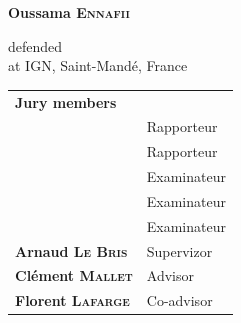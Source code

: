 \begin{titlepage}
\begin{center}
        \vspace*{10mm}

        \begin{large}
            \textbf{Oussama \textsc{Ennafii}}
        \end{large}

        \vspace*{10mm}

        defended  \\
        at IGN, Saint-Mand\'e, France

        \vfill

        \begin{tabular}{l l}
            \large \textbf{Jury members} & \\
            & Rapporteur \\
            & Rapporteur \\
            & Examinateur \\
            & Examinateur \\
            & Examinateur \\
            \textbf{Arnaud \textsc{Le Bris}} & Supervizor \\
            \textbf{Clément \textsc{Mallet}} & Advisor \\
            \textbf{Florent \textsc{Lafarge}} & Co-advisor \\
        \end{tabular}
    \end{center}
\end{titlepage}
